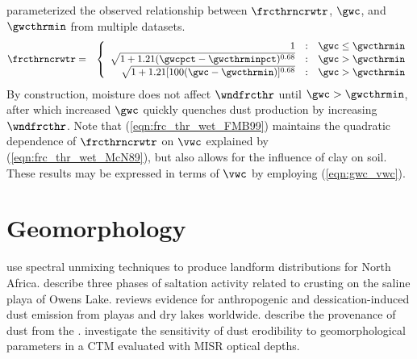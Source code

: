 \documentclass[12pt,twoside]{book}
\begin{document}
\cite{FMB99} parameterized the observed relationship between
$\frcthrncrwtr$, $\gwc$, and $\gwcthrmin$ from multiple datasets.
\begin{eqnarray}
\frcthrncrwtr & = & \left\{
\begin{array}{r@{\quad:\quad}l}
1 & \gwc \le \gwcthrmin \\
\sqrt{ 1 + 1.21 ( \gwcpct - \gwcthrminpct )^{0.68} } & \gwc > \gwcthrmin \\
\sqrt{ 1 + 1.21 [ 100 ( \gwc - \gwcthrmin ) ]^{0.68} } & \gwc > \gwcthrmin
\end{array} \right.
\label{eqn:frc_thr_wet_FMB99}
\end{eqnarray}
By construction, moisture does not affect $\wndfrcthr$ until $\gwc >
\gwcthrmin$, after which increased $\gwc$ quickly quenches dust
production by increasing $\wndfrcthr$.
Note that (\ref{eqn:frc_thr_wet_FMB99}) maintains the quadratic
dependence of $\frcthrncrwtr$ on $\vwc$ explained by \cite{McN89}
(\ref{eqn:frc_thr_wet_McN89}), but also allows for the influence of
clay on soil.
These results may be expressed in terms of $\vwc$ by employing
(\ref{eqn:gwc_vwc}).

\section[Geomorphology]{Geomorphology}\label{sxn:gmr_ltr}
\cite{SGS02}
\cite{TSG02}
\cite{BOP05} use spectral unmixing techniques to produce landform
distributions for North Africa. 
\cite{THK02}
\cite{ZNT03}
\cite{GNH01} describe three phases of saltation activity related to 
crusting on the saline playa of Owens Lake.
\cite{Gil96} reviews evidence for anthropogenic and
dessication-induced dust emission from playas and dry lakes
worldwide. 
\cite{EJK04} describe the provenance of dust from the 
. 
\cite{KoF08} investigate the sensitivity of dust erodibility to
geomorphological parameters in a CTM evaluated with MISR optical
depths. 
\end{document}

